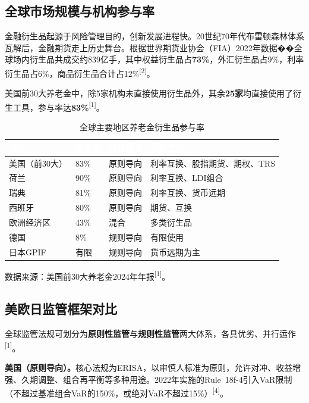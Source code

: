 \documentclass[10pt,a4paper,twocolumn]{ctexart}
\begin{document}
\subsection{全球市场规模与机构参与率}

金融衍生品起源于风险管理目的，创新发展进程快。20世纪70年代布雷顿森林体系瓦解后，金融期货走上历史舞台。根据世界期货业协会（FIA）2022年数据��全球场内衍生品共成交约839亿手，其中权益衍生品占\textbf{73\%}，外汇衍生品占9\%，利率衍生品占6\%，商品衍生品合计占12\%\textsuperscript{[2]}。

美国前30大养老金中，除5家机构未直接使用衍生品外，其余\textbf{25家}均直接使用了衍生工具，参与率达\textbf{83\%}\textsuperscript{[1]}。

\begin{table}[H]
\centering\scriptsize
\caption{全球主要地区养老金衍生品参与率}
\label{tab:participation}
\renewcommand{\arraystretch}{1.25}
\setlength{\tabcolsep}{4pt}
\begin{tabularx}{\columnwidth}{@{}L{1.4cm}C{0.9cm}L{1.3cm}X@{}}
\toprule
{}
\textcolor{white}{\textbf{地区}} &
\textcolor{white}{\textbf{参与率}} &
\textcolor{white}{\textbf{监管模式}} &
\textcolor{white}{\textbf{典型工具}} \\
\midrule
美国（前30大）& 83\% & 原则导向 & 利率互换、股指期货、期权、TRS \\
荷兰 & 90\% & 原则导向 & 利率互换、LDI组合 \\
瑞典 & 81\% & 原则导向 & 利率互换、货币远期 \\
西班牙 & 80\% & 原则导向 & 期货、互换 \\
欧洲经济区 & 43\% & 混合 & 多类衍生品 \\
德国 & 8\% & 规则导向 & 有限使用 \\
日本GPIF & 有限 & 规则导向 & 货币远期为主 \\
\bottomrule
\end{tabularx}
\end{table}

{\scriptsize 数据来源：美国前30大养老金2024年年报\textsuperscript{[1]}。}

\subsection{美欧日监管框架对比}

全球监管法规可划分为\textbf{原则性监管}与\textbf{规则性监管}两大体系，各具优劣、并行运作\textsuperscript{[1]}。

\textbf{美国（原则导向）。}核心法规为ERISA，以审慎人标准为原则，允许对冲、收益增强、久期调整、组合再平衡等多种用途。2022年实施的Rule~18f-4引入VaR限制（不超过基准组合VaR的150\%，或绝对VaR不超过15\%）\textsuperscript{[4]}。
\end{document}
